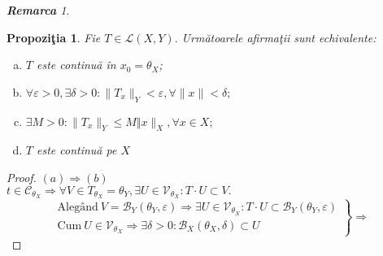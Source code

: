 \documentclass[ a4paper, 12pt]{report}
\newtheorem{prop}[theorem]{\bf Propozi\c tia }
\theoremstyle{remark}
\newtheorem{remarc}{\bf Remarca}[section]
\numberwithin{equation}{section}
\begin{document}
\begin{remarc}
\begin{enumerate}
\end{enumerate}
\begin{prop}
Fie $T \in \mathcal{L}(X,Y).$ Urm\u atoarele afirma\c tii sunt echivalente:
\begin{enumerate}[(a)]
\item $T$ este continu\u a \^in $x_0 = \theta_{X}$;
\item $\forall \varepsilon > 0, \exists \delta>0: \lVert T_x \rVert_Y< \varepsilon, \forall \lVert x \rVert< \delta;$
\item $\exists M>0: \lVert T_x \rVert_Y \leq M \Vert x \rVert_X, \forall x \in X;$
\item $T$ este continu\u a pe $X$
\end{enumerate}
\end{prop}
\begin{proof}
$(a) \Longrightarrow (b)$\\
$t \in \mathcal{C}_{\theta_{X}} \Rightarrow \forall V \in T_{\theta_{X}} = \theta_{Y}, \exists U \in \mathcal{V}_{\theta_{X}}: T \cdot U \subset V.$\\

\begin{equation*}
  \left.\begin{aligned}
         \mbox{Aleg\^and}\  V = \mathcal{B}_{Y}(\theta_{Y}, \varepsilon) \Rightarrow \exists U \in \mathcal{V}_{\theta_{X}}: T \cdot U \subset \mathcal{B}_{Y}(\theta_{Y}, \varepsilon)\\
         \mbox{Cum}\ U \in \mathcal{V}_{\theta_{X}} \Rightarrow \exists \delta>0: \mathcal{B}_{X}(\theta_{X}, \delta) \subset U
        \end{aligned}
  \right\}
  \mbox{$\Rightarrow$}
 \end{equation*}


\end{proof}
\end{remarc}
\end{document}
